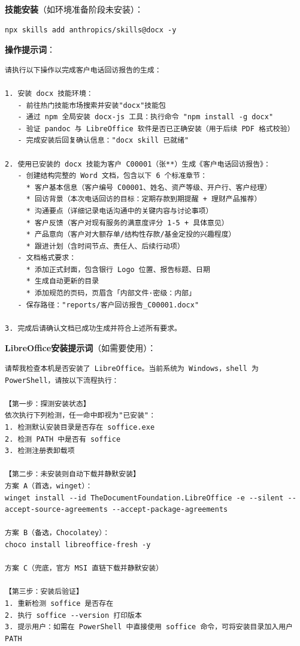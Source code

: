 \textbf{技能安装}（如环境准备阶段未安装）：

\begin{lstlisting}[style=shell]
npx skills add anthropics/skills@docx -y
\end{lstlisting}

\textbf{操作提示词}：

\begin{lstlisting}
请执行以下操作以完成客户电话回访报告的生成：

1. 安装 docx 技能环境：
   - 前往热门技能市场搜索并安装"docx"技能包
   - 通过 npm 全局安装 docx-js 工具：执行命令 "npm install -g docx"
   - 验证 pandoc 与 LibreOffice 软件是否已正确安装（用于后续 PDF 格式校验）
   - 完成安装后回复确认信息："docx skill 已就绪"

2. 使用已安装的 docx 技能为客户 C00001（张**）生成《客户电话回访报告》：
   - 创建结构完整的 Word 文档，包含以下 6 个标准章节：
     * 客户基本信息（客户编号 C00001、姓名、资产等级、开户行、客户经理）
     * 回访背景（本次电话回访的目标：定期存款到期提醒 + 理财产品推荐）
     * 沟通要点（详细记录电话沟通中的关键内容与讨论事项）
     * 客户反馈（客户对现有服务的满意度评分 1-5 + 具体意见）
     * 产品意向（客户对大额存单/结构性存款/基金定投的兴趣程度）
     * 跟进计划（含时间节点、责任人、后续行动项）
   - 文档格式要求：
     * 添加正式封面，包含银行 Logo 位置、报告标题、日期
     * 生成自动更新的目录
     * 添加规范的页码，页眉含「内部文件·密级：内部」
   - 保存路径："reports/客户回访报告_C00001.docx"

3. 完成后请确认文档已成功生成并符合上述所有要求。
\end{lstlisting}

\textbf{LibreOffice安装提示词}（如需要使用）：

\begin{lstlisting}
请帮我检查本机是否安装了 LibreOffice。当前系统为 Windows，shell 为 PowerShell，请按以下流程执行：

【第一步：探测安装状态】
依次执行下列检测，任一命中即视为"已安装"：
1. 检测默认安装目录是否存在 soffice.exe
2. 检测 PATH 中是否有 soffice
3. 检测注册表卸载项

【第二步：未安装则自动下载并静默安装】
方案 A（首选，winget）：
winget install --id TheDocumentFoundation.LibreOffice -e --silent --accept-source-agreements --accept-package-agreements

方案 B（备选，Chocolatey）：
choco install libreoffice-fresh -y

方案 C（兜底，官方 MSI 直链下载并静默安装）

【第三步：安装后验证】
1. 重新检测 soffice 是否存在
2. 执行 soffice --version 打印版本
3. 提示用户：如需在 PowerShell 中直接使用 soffice 命令，可将安装目录加入用户 PATH
\end{lstlisting}

